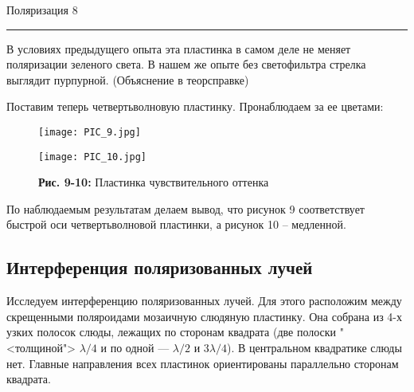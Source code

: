 \documentclass[12pt,a4paper]{scrartcl}
\begin{document}
 	\newpage
 	
 	
 	\begin{flushleft}
 		\footnotesize{Поляризация} \hspace{\fill} \footnotesize{8}
 		\\[-0.3cm]\noindent\rule{\textwidth}{0.3pt}
 	\end{flushleft}
 	
 	В условиях предыдущего опыта эта пластинка в самом деле не меняет поляризации зеленого света. В нашем же опыте без светофильтра стрелка выглядит пурпурной. (Объяснение в теорсправке)
 	
 	Поставим теперь четвертьволновую пластинку. Пронаблюдаем за ее цветами:
 	
 	\begin{figure}[h]
 		\begin{minipage}{0.5\linewidth}
 			\begin{center}
 				\texttt{[image: PIC\_9.jpg]}
 			\end{center}
 		\end{minipage}
 		\begin{minipage}{0.5\linewidth}
 			 \begin{center}
 				\texttt{[image: PIC\_10.jpg]}
 			\end{center}
 		\end{minipage}
 		\begin{center}
 			\textbf{Рис. 9-10:} Пластинка чувствительного оттенка
 		\end{center}
 	\end{figure}
 	
 	По наблюдаемым результатам делаем вывод, что рисунок 9 соответствует быстрой оси четвертьволновой пластинки, а рисунок 10 -- медленной.
 	
 	\subsection{Интерференция поляризованных лучей}
 	
 	Исследуем интерференцию поляризованных лучей. Для этого расположим между скрещенными поляроидами мозаичную слюдяную пластинку. Она собрана из 4-х узких полосок слюды, лежащих по сторонам
 	квадрата (две полоски "<толщиной"> $ \lambda/4 $ и по одной --- $ \lambda/2 $ и $ 3\lambda/4 $). В центральном квадратике слюды нет. Главные направления всех пластинок ориентированы параллельно сторонам квадрата.
 	
\end{document}
